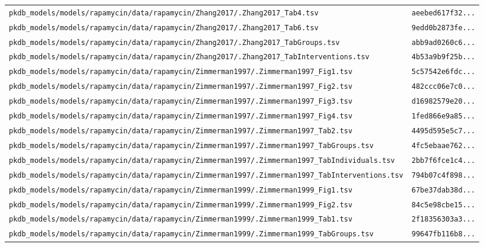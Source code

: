 \begin{longtable}{ll}
\texttt{pkdb\_models/models/rapamycin/data/rapamycin/Zhang2017/.Zhang2017\_Tab4.tsv} & \texttt{aeebed617f32...} \\
\texttt{pkdb\_models/models/rapamycin/data/rapamycin/Zhang2017/.Zhang2017\_Tab6.tsv} & \texttt{9edd0b2873fe...} \\
\texttt{pkdb\_models/models/rapamycin/data/rapamycin/Zhang2017/.Zhang2017\_TabGroups.tsv} & \texttt{abb9ad0260c6...} \\
\texttt{pkdb\_models/models/rapamycin/data/rapamycin/Zhang2017/.Zhang2017\_TabInterventions.tsv} & \texttt{4b53a9b9f25b...} \\
\texttt{pkdb\_models/models/rapamycin/data/rapamycin/Zimmerman1997/.Zimmerman1997\_Fig1.tsv} & \texttt{5c57542e6fdc...} \\
\texttt{pkdb\_models/models/rapamycin/data/rapamycin/Zimmerman1997/.Zimmerman1997\_Fig2.tsv} & \texttt{482ccc06e7c0...} \\
\texttt{pkdb\_models/models/rapamycin/data/rapamycin/Zimmerman1997/.Zimmerman1997\_Fig3.tsv} & \texttt{d16982579e20...} \\
\texttt{pkdb\_models/models/rapamycin/data/rapamycin/Zimmerman1997/.Zimmerman1997\_Fig4.tsv} & \texttt{1fed866e9a85...} \\
\texttt{pkdb\_models/models/rapamycin/data/rapamycin/Zimmerman1997/.Zimmerman1997\_Tab2.tsv} & \texttt{4495d595e5c7...} \\
\texttt{pkdb\_models/models/rapamycin/data/rapamycin/Zimmerman1997/.Zimmerman1997\_TabGroups.tsv} & \texttt{4fc5ebaae762...} \\
\texttt{pkdb\_models/models/rapamycin/data/rapamycin/Zimmerman1997/.Zimmerman1997\_TabIndividuals.tsv} & \texttt{2bb7f6fce1c4...} \\
\texttt{pkdb\_models/models/rapamycin/data/rapamycin/Zimmerman1997/.Zimmerman1997\_TabInterventions.tsv} & \texttt{794b07c4f898...} \\
\texttt{pkdb\_models/models/rapamycin/data/rapamycin/Zimmerman1999/.Zimmerman1999\_Fig1.tsv} & \texttt{67be37dab38d...} \\
\texttt{pkdb\_models/models/rapamycin/data/rapamycin/Zimmerman1999/.Zimmerman1999\_Fig2.tsv} & \texttt{84c5e98cbe15...} \\
\texttt{pkdb\_models/models/rapamycin/data/rapamycin/Zimmerman1999/.Zimmerman1999\_Tab1.tsv} & \texttt{2f18356303a3...} \\
\texttt{pkdb\_models/models/rapamycin/data/rapamycin/Zimmerman1999/.Zimmerman1999\_TabGroups.tsv} & \texttt{99647fb116b8...} \\

\end{longtable}

